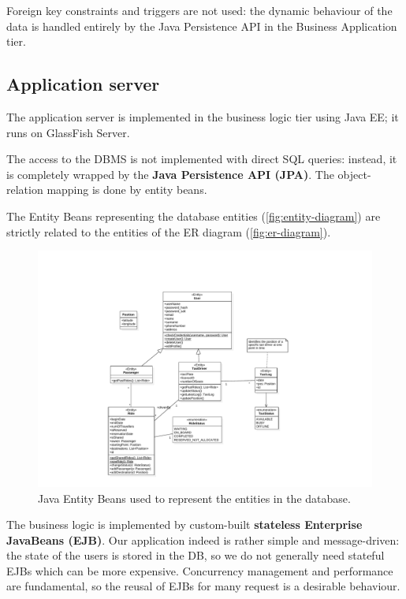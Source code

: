Foreign key constraints and triggers are not used: the dynamic behaviour of the data is handled entirely by the Java Persistence API in the Business Application tier.

\subsection{Application server}
The application server is implemented in the business logic tier using Java EE; it runs on GlassFish Server.

The access to the DBMS is not implemented with direct SQL queries: instead, it is completely wrapped by the \textbf{Java Persistence API (JPA)}. The object-relation mapping is done by entity beans.

The Entity Beans representing the database entities (\autoref{fig:entity-diagram}) are strictly related to the entities of the ER diagram (\autoref{fig:er-diagram}).

\begin{figure}
    \centering
    \includegraphics[width=\textwidth]{diagrams/entity_diagram}
    \caption{Java Entity Beans used to represent the entities in the database.}
    \label{fig:entity-diagram}
\end{figure}

The business logic is implemented by custom-built \textbf{stateless Enterprise JavaBeans (EJB)}.
Our application indeed is rather simple and message-driven: the state of the users is stored in the DB, so we do not generally need stateful EJBs which can be more expensive.
Concurrency management and performance are fundamental, so the reusal of EJBs for many request is a desirable behaviour.

